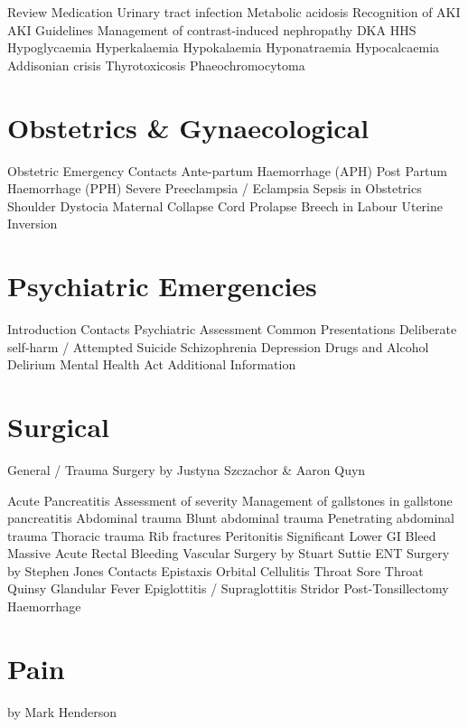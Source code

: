 \documentclass[]{book}
\begin{document}
Review Medication
Urinary tract infection
Metabolic acidosis
Recognition of AKI
AKI Guidelines
Management of contrast-induced nephropathy
DKA
HHS
Hypoglycaemia
Hyperkalaemia
Hypokalaemia
Hyponatraemia
Hypocalcaemia
Addisonian crisis
Thyrotoxicosis
Phaeochromocytoma

\hypertarget{obsandgynae}{%
\chapter{Obstetrics \& Gynaecological}\label{obsandgynae}}

Obstetric Emergency Contacts
Ante-partum Haemorrhage (APH)
Post Partum Haemorrhage (PPH)
Severe Preeclampsia / Eclampsia
Sepsis in Obstetrics
Shoulder Dystocia
Maternal Collapse
Cord Prolapse
Breech in Labour
Uterine Inversion

\hypertarget{psychemerg}{%
\chapter{Psychiatric Emergencies}\label{psychemerg}}

Introduction
Contacts
Psychiatric Assessment
Common Presentations
Deliberate self-harm / Attempted Suicide
Schizophrenia
Depression
Drugs and Alcohol
Delirium
Mental Health Act
Additional Information

\hypertarget{surg}{%
\chapter{Surgical}\label{surg}}

General / Trauma Surgery by Justyna Szczachor \& Aaron Quyn

Acute Pancreatitis
Assessment of severity
Management of gallstones in gallstone pancreatitis
Abdominal trauma
Blunt abdominal trauma
Penetrating abdominal trauma
Thoracic trauma
Rib fractures
Peritonitis
Significant Lower GI Bleed
Massive Acute Rectal Bleeding
Vascular Surgery by Stuart Suttie
ENT Surgery by Stephen Jones
Contacts
Epistaxis
Orbital Cellulitis
Throat
Sore Throat
Quinsy
Glandular Fever
Epiglottitis / Supraglottitis
Stridor
Post-Tonsillectomy Haemorrhage

\hypertarget{pain}{%
\chapter{Pain}\label{pain}}

by Mark Henderson
\end{document}
